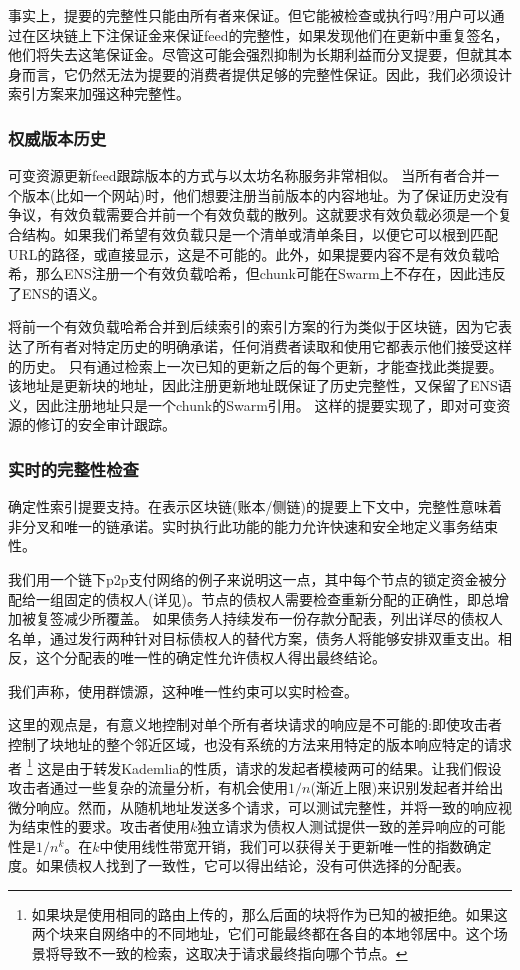 事实上，提要的完整性只能由所有者来保证。但它能被检查或执行吗?用户可以通过在区块链上下注保证金来保证feed的完整性，如果发现他们在更新中重复签名，他们将失去这笔保证金。尽管这可能会强烈抑制为长期利益而分叉提要，但就其本身而言，它仍然无法为提要的消费者提供足够的完整性保证。因此，我们必须设计索引方案来加强这种完整性。

\subsubsection{权威版本历史}

可变资源更新feed跟踪版本的方式与以太坊名称服务非常相似。  
当所有者合并一个版本(比如一个网站)时，他们想要注册当前版本的内容地址。为了保证历史没有争议，有效负载需要合并前一个有效负载的散列。这就要求有效负载必须是一个复合结构。如果我们希望有效负载只是一个清单或清单条目，以便它可以根到匹配URL的路径，或直接显示，这是不可能的。此外，如果提要内容不是有效负载哈希，那么ENS注册一个有效负载哈希，但chunk可能在Swarm上不存在，因此违反了ENS的语义。

将前一个有效负载哈希合并到后续索引的索引方案的行为类似于区块链，因为它表达了所有者对特定历史的明确承诺，任何消费者读取和使用它都表示他们接受这样的历史。 
只有通过检索上一次已知的更新之后的每个更新，才能查找此类提要。该地址是更新块的地址，因此注册更新地址既保证了历史完整性，又保留了ENS语义，因此注册地址只是一个chunk的Swarm引用。
这样的提要实现了，即对可变资源的修订的安全审计跟踪。 

\subsubsection{实时的完整性检查}

确定性索引提要支持。在表示区块链(账本/侧链)的提要上下文中，完整性意味着非分叉和唯一的链承诺。实时执行此功能的能力允许快速和安全地定义事务结束性。 

我们用一个链下p2p支付网络的例子来说明这一点，其中每个节点的锁定资金被分配给一组固定的债权人(详见\cite{ethersphere2019swap})。节点的债权人需要检查重新分配的正确性，即总增加被复签减少所覆盖。 
如果债务人持续发布一份存款分配表，列出详尽的债权人名单，通过发行两种针对目标债权人的替代方案，债务人将能够安排双重支出。相反，这个分配表的唯一性的确定性允许债权人得出最终结论。

我们声称，使用群馈源，这种唯一性约束可以实时检查。

这里的观点是，有意义地控制对单个所有者块请求的响应是不可能的:即使攻击者控制了块地址的整个邻近区域，也没有系统的方法来用特定的版本响应特定的请求者
%
\footnote{如果块是使用相同的路由上传的，那么后面的块将作为已知的被拒绝。如果这两个块来自网络中的不同地址，它们可能最终都在各自的本地邻居中。这个场景将导致不一致的检索，这取决于请求最终指向哪个节点。}
%
这是由于转发Kademlia的性质，请求的发起者模棱两可的结果。让我们假设攻击者通过一些复杂的流量分析，有机会使用$1/n$(渐近上限)来识别发起者并给出微分响应。然而，从随机地址发送多个请求，可以测试完整性，并将一致的响应视为结束性的要求。攻击者使用$k$独立请求为债权人测试提供一致的差异响应的可能性是$1/n^k$。在$k$中使用线性带宽开销，我们可以获得关于更新唯一性的指数确定度。如果债权人找到了一致性，它可以得出结论，没有可供选择的分配表。


